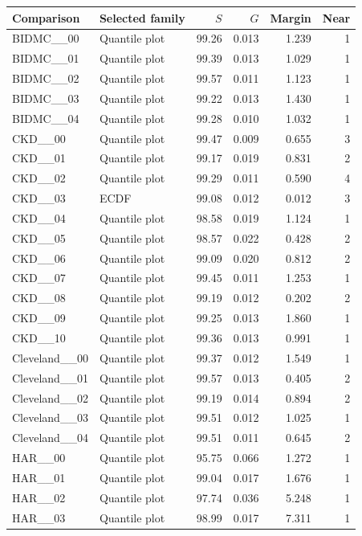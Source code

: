 \begin{longtable}{llrrrr}\toprule
Comparison & Selected family & $S$ & $G$ & Margin & Near\\\midrule\endhead
BIDMC\_\_00 & Quantile plot & 99.26 & 0.013 & 1.239 & 1\\
BIDMC\_\_01 & Quantile plot & 99.39 & 0.013 & 1.029 & 1\\
BIDMC\_\_02 & Quantile plot & 99.57 & 0.011 & 1.123 & 1\\
BIDMC\_\_03 & Quantile plot & 99.22 & 0.013 & 1.430 & 1\\
BIDMC\_\_04 & Quantile plot & 99.28 & 0.010 & 1.032 & 1\\
CKD\_\_00 & Quantile plot & 99.47 & 0.009 & 0.655 & 3\\
CKD\_\_01 & Quantile plot & 99.17 & 0.019 & 0.831 & 2\\
CKD\_\_02 & Quantile plot & 99.29 & 0.011 & 0.590 & 4\\
CKD\_\_03 & ECDF & 99.08 & 0.012 & 0.012 & 3\\
CKD\_\_04 & Quantile plot & 98.58 & 0.019 & 1.124 & 1\\
CKD\_\_05 & Quantile plot & 98.57 & 0.022 & 0.428 & 2\\
CKD\_\_06 & Quantile plot & 99.09 & 0.020 & 0.812 & 2\\
CKD\_\_07 & Quantile plot & 99.45 & 0.011 & 1.253 & 1\\
CKD\_\_08 & Quantile plot & 99.19 & 0.012 & 0.202 & 2\\
CKD\_\_09 & Quantile plot & 99.25 & 0.013 & 1.860 & 1\\
CKD\_\_10 & Quantile plot & 99.36 & 0.013 & 0.991 & 1\\
Cleveland\_\_00 & Quantile plot & 99.37 & 0.012 & 1.549 & 1\\
Cleveland\_\_01 & Quantile plot & 99.57 & 0.013 & 0.405 & 2\\
Cleveland\_\_02 & Quantile plot & 99.19 & 0.014 & 0.894 & 2\\
Cleveland\_\_03 & Quantile plot & 99.51 & 0.012 & 1.025 & 1\\
Cleveland\_\_04 & Quantile plot & 99.51 & 0.011 & 0.645 & 2\\
HAR\_\_00 & Quantile plot & 95.75 & 0.066 & 1.272 & 1\\
HAR\_\_01 & Quantile plot & 99.04 & 0.017 & 1.676 & 1\\
HAR\_\_02 & Quantile plot & 97.74 & 0.036 & 5.248 & 1\\
HAR\_\_03 & Quantile plot & 98.99 & 0.017 & 7.311 & 1\\

\end{longtable}
